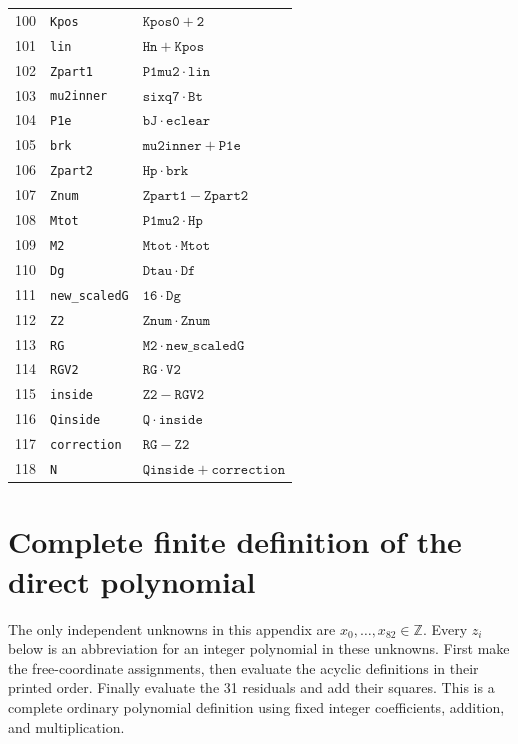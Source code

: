 \documentclass[11pt]{article}
\theoremstyle{remark}
\begin{document}
\begin{longtable}{rll}
100 & \texttt{Kpos} & $\mathtt{Kpos0} + \mathtt{2}$ \\
101 & \texttt{lin} & $\mathtt{Hn} + \mathtt{Kpos}$ \\
102 & \texttt{Zpart1} & $\mathtt{P1mu2} \mathbin{\cdot} \mathtt{lin}$ \\
103 & \texttt{mu2inner} & $\mathtt{sixq7} \mathbin{\cdot} \mathtt{Bt}$ \\
104 & \texttt{P1e} & $\mathtt{bJ} \mathbin{\cdot} \mathtt{eclear}$ \\
105 & \texttt{brk} & $\mathtt{mu2inner} + \mathtt{P1e}$ \\
106 & \texttt{Zpart2} & $\mathtt{Hp} \mathbin{\cdot} \mathtt{brk}$ \\
107 & \texttt{Znum} & $\mathtt{Zpart1} - \mathtt{Zpart2}$ \\
108 & \texttt{Mtot} & $\mathtt{P1mu2} \mathbin{\cdot} \mathtt{Hp}$ \\
109 & \texttt{M2} & $\mathtt{Mtot} \mathbin{\cdot} \mathtt{Mtot}$ \\
110 & \texttt{Dg} & $\mathtt{Dtau} \mathbin{\cdot} \mathtt{Df}$ \\
111 & \texttt{new\_scaledG} & $\mathtt{16} \mathbin{\cdot} \mathtt{Dg}$ \\
112 & \texttt{Z2} & $\mathtt{Znum} \mathbin{\cdot} \mathtt{Znum}$ \\
113 & \texttt{RG} & $\mathtt{M2} \mathbin{\cdot} \mathtt{new\_scaledG}$ \\
114 & \texttt{RGV2} & $\mathtt{RG} \mathbin{\cdot} \mathtt{V2}$ \\
115 & \texttt{inside} & $\mathtt{Z2} - \mathtt{RGV2}$ \\
116 & \texttt{Qinside} & $\mathtt{Q} \mathbin{\cdot} \mathtt{inside}$ \\
117 & \texttt{correction} & $\mathtt{RG} - \mathtt{Z2}$ \\
118 & \texttt{N} & $\mathtt{Qinside} + \mathtt{correction}$ \\
\bottomrule\end{longtable}
\endgroup




\section{Complete finite definition of the direct polynomial}\label{app:direct83-definition}
The only independent unknowns in this appendix are $x_0,\ldots,x_{82}\in\mathbb Z$. Every $z_i$ below is an abbreviation for an integer polynomial in these unknowns. First make the free-coordinate assignments, then evaluate the acyclic definitions in their printed order. Finally evaluate the 31 residuals and add their squares. This is a complete ordinary polynomial definition using fixed integer coefficients, addition, and multiplication.
\begingroup\small\allowdisplaybreaks
\end{document}

